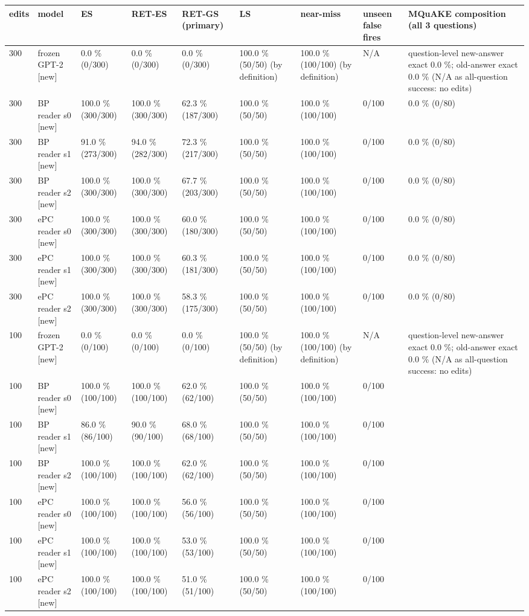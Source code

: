 \documentclass[10pt,a4paper]{article}
\begin{document}
\begin{center}\scriptsize
\begin{tabularx}{\textwidth}{@{}p{}XXXXXXXX@{}}
\toprule
edits & model & ES & RET-ES & RET-GS (primary) & LS & near-miss & unseen false fires & MQuAKE composition (all 3 questions) \\ \midrule
300 & frozen GPT-2 [new] & 0.0 \% (0/300) & 0.0 \% (0/300) & 0.0 \% (0/300) & 100.0 \% (50/50) (by definition) & 100.0 \% (100/100) (by definition) & N/A & question-level new-answer exact 0.0 \%; old-answer exact 0.0 \% (N/A as all-question success: no edits) \\
300 & BP reader s0 [new] & 100.0 \% (300/300) & 100.0 \% (300/300) & 62.3 \% (187/300) & 100.0 \% (50/50) & 100.0 \% (100/100) & 0/100 & 0.0 \% (0/80) \\
300 & BP reader s1 [new] & 91.0 \% (273/300) & 94.0 \% (282/300) & 72.3 \% (217/300) & 100.0 \% (50/50) & 100.0 \% (100/100) & 0/100 & 0.0 \% (0/80) \\
300 & BP reader s2 [new] & 100.0 \% (300/300) & 100.0 \% (300/300) & 67.7 \% (203/300) & 100.0 \% (50/50) & 100.0 \% (100/100) & 0/100 & 0.0 \% (0/80) \\
300 & ePC reader s0 [new] & 100.0 \% (300/300) & 100.0 \% (300/300) & 60.0 \% (180/300) & 100.0 \% (50/50) & 100.0 \% (100/100) & 0/100 & 0.0 \% (0/80) \\
300 & ePC reader s1 [new] & 100.0 \% (300/300) & 100.0 \% (300/300) & 60.3 \% (181/300) & 100.0 \% (50/50) & 100.0 \% (100/100) & 0/100 & 0.0 \% (0/80) \\
300 & ePC reader s2 [new] & 100.0 \% (300/300) & 100.0 \% (300/300) & 58.3 \% (175/300) & 100.0 \% (50/50) & 100.0 \% (100/100) & 0/100 & 0.0 \% (0/80) \\
100 & frozen GPT-2 [new] & 0.0 \% (0/100) & 0.0 \% (0/100) & 0.0 \% (0/100) & 100.0 \% (50/50) (by definition) & 100.0 \% (100/100) (by definition) & N/A & question-level new-answer exact 0.0 \%; old-answer exact 0.0 \% (N/A as all-question success: no edits) \\
100 & BP reader s0 [new] & 100.0 \% (100/100) & 100.0 \% (100/100) & 62.0 \% (62/100) & 100.0 \% (50/50) & 100.0 \% (100/100) & 0/100 &  \\
100 & BP reader s1 [new] & 86.0 \% (86/100) & 90.0 \% (90/100) & 68.0 \% (68/100) & 100.0 \% (50/50) & 100.0 \% (100/100) & 0/100 &  \\
100 & BP reader s2 [new] & 100.0 \% (100/100) & 100.0 \% (100/100) & 62.0 \% (62/100) & 100.0 \% (50/50) & 100.0 \% (100/100) & 0/100 &  \\
100 & ePC reader s0 [new] & 100.0 \% (100/100) & 100.0 \% (100/100) & 56.0 \% (56/100) & 100.0 \% (50/50) & 100.0 \% (100/100) & 0/100 &  \\
100 & ePC reader s1 [new] & 100.0 \% (100/100) & 100.0 \% (100/100) & 53.0 \% (53/100) & 100.0 \% (50/50) & 100.0 \% (100/100) & 0/100 &  \\
100 & ePC reader s2 [new] & 100.0 \% (100/100) & 100.0 \% (100/100) & 51.0 \% (51/100) & 100.0 \% (50/50) & 100.0 \% (100/100) & 0/100 &  \\
\bottomrule
\end{tabularx}
\end{center}
\end{document}
